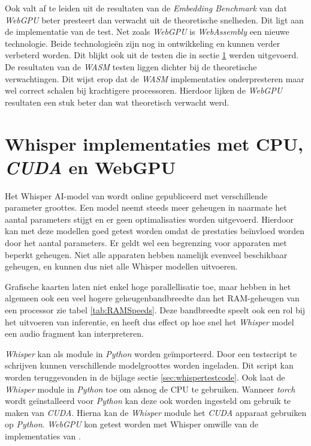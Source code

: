 \bigbreak{}

Ook valt af te leiden uit de resultaten van de \textit{Embedding Benchmark} van \textcite{Lochner2024} dat \textit{WebGPU} beter presteert dan verwacht uit de theoretische snelheden. Dit ligt aan de implementatie van de test. Net zoals \textit{WebGPU} is \textit{WebAssembly} een nieuwe technologie. Beide technologieën zijn nog in ontwikkeling en kunnen verder verbeterd worden. Dit blijkt ook uit de testen die in sectie \ref{sec:whispertest} werden uitgevoerd. De resultaten van de \textit{WASM} testen liggen dichter bij de theoretische verwachtingen. Dit wijst erop dat de \textit{WASM} implementaties onderpresteren maar wel correct schalen bij krachtigere processoren. Hierdoor lijken de \textit{WebGPU} resultaten een stuk beter dan wat theoretisch verwacht werd.

\break{}

\section{Whisper implementaties met CPU, \textit{CUDA} en WebGPU}%
\label{sec:whispertest}

Het Whisper AI-model van \textcite{OpenAI2023} wordt online gepubliceerd met verschillende parameter groottes. Een model neemt steeds meer geheugen in naarmate het aantal parameters stijgt en er geen optimalisaties worden uitgevoerd. Hierdoor kan met deze modellen goed getest worden omdat de prestaties beïnvloed worden door het aantal parameters. Er geldt wel een begrenzing voor apparaten met beperkt geheugen. Niet alle apparaten hebben namelijk evenveel beschikbaar geheugen, en kunnen dus niet alle Whisper modellen uitvoeren. 

\bigbreak{}

Grafische kaarten laten niet enkel hoge parallellisatie toe, maar hebben in het algemeen ook een veel hogere geheugenbandbreedte dan het RAM-geheugen van een processor zie tabel \ref{tab:RAMSpeeds}. Deze bandbreedte speelt ook een rol bij het uitvoeren van inferentie, en heeft dus effect op hoe snel het \textit{Whisper} model een audio fragment kan interpreteren.

\bigbreak{}

\textit{Whisper} kan als module in \textit{Python} worden geïmporteerd. Door een testscript te schrijven kunnen verschillende modelgroottes worden ingeladen. Dit script kan worden teruggevonden in de bijlage sectie \ref{sec:whispertestcode}. Ook laat de \textit{Whisper} module in \textit{Python} toe om alsnog de CPU te gebruiken. Wanneer \textit{torch} wordt geïnstalleerd voor \textit{Python} kan deze ook worden ingesteld om gebruik te maken van \textit{CUDA}. Hierna kan de \textit{Whisper} module het \textit{CUDA} apparaat gebruiken op \textit{Python}. \textit{WebGPU} kon getest worden met Whisper omwille van de implementaties van \textcite{Fleetwood2024, Fleetwood2023b}.

